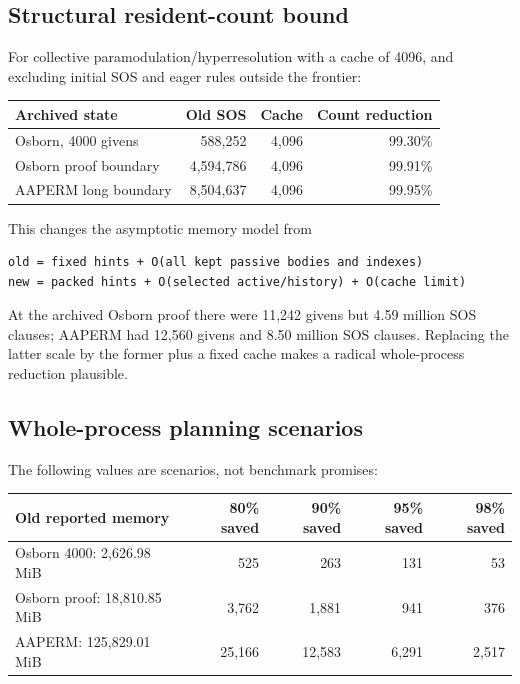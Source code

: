 \documentclass[11pt]{article}
\begin{document}
\subsection{Structural resident-count bound}

For collective paramodulation/hyperresolution with a cache of 4096, and
excluding initial SOS and eager rules outside the frontier:

\begin{center}
\begin{tabular}{lrrr}
\toprule
Archived state & Old SOS & Cache & Count reduction \\
\midrule
Osborn, 4000 givens & 588,252 & 4,096 & 99.30\% \\
Osborn proof boundary & 4,594,786 & 4,096 & 99.91\% \\
AAPERM long boundary & 8,504,637 & 4,096 & 99.95\% \\
\bottomrule
\end{tabular}
\end{center}

This changes the asymptotic memory model from

\begin{lstlisting}
old = fixed hints + O(all kept passive bodies and indexes)
new = packed hints + O(selected active/history) + O(cache limit)
\end{lstlisting}

At the archived Osborn proof there were 11,242 givens but 4.59 million SOS
clauses; AAPERM had 12,560 givens and 8.50 million SOS clauses.  Replacing the
latter scale by the former plus a fixed cache makes a radical whole-process
reduction plausible.

\subsection{Whole-process planning scenarios}

The following values are scenarios, not benchmark promises:

\begin{center}
\begin{tabular}{lrrrr}
\toprule
Old reported memory & 80\% saved & 90\% saved & 95\% saved & 98\% saved \\
\midrule
Osborn 4000: 2,626.98 MiB & 525 & 263 & 131 & 53 \\
Osborn proof: 18,810.85 MiB & 3,762 & 1,881 & 941 & 376 \\
AAPERM: 125,829.01 MiB & 25,166 & 12,583 & 6,291 & 2,517 \\
\bottomrule
\end{tabular}
\end{center}
\end{document}
